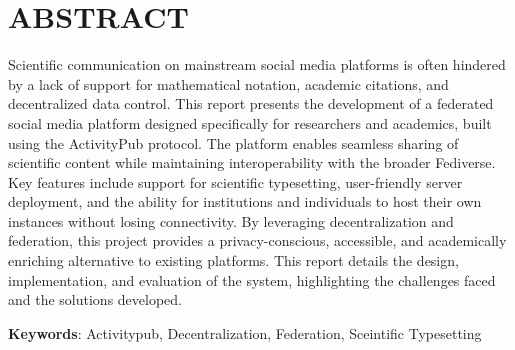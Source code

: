 \chapter*{ABSTRACT}

Scientific communication on mainstream social media platforms is often hindered by a lack of support for mathematical notation, academic citations, and decentralized data control. This report presents the development of a federated social media platform designed specifically for researchers and academics, built using the ActivityPub protocol. The platform enables seamless sharing of scientific content while maintaining interoperability with the broader Fediverse. Key features include support for scientific typesetting, user-friendly server deployment, and the ability for institutions and individuals to host their own instances without losing connectivity. By leveraging decentralization and federation, this project provides a privacy-conscious, accessible, and academically enriching alternative to existing platforms. This report details the design, implementation, and evaluation of the system, highlighting the challenges faced and the solutions developed.

\textbf{Keywords}: Activitypub, Decentralization, Federation,  Sceintific Typesetting
